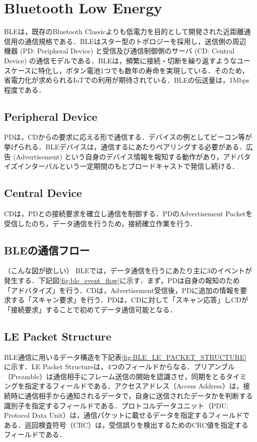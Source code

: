 \section{Bluetooth Low Energy}
BLEは，既存のBluetooth Classicよりも低電力を目的として開発された近距離通信用の通信規格である．BLEはスター型のトポロジーを採用し，送信側の周辺機器 (PD: Peripheral Device) と受信及び通信制御側のサーバ (CD: Central Device) の通信モデルである．BLEは，頻繁に接続・切断を繰り返すようなユースケースに特化し，ボタン電池1つでも数年の寿命を実現している．そのため，省電力化が求められるIoTでの利用が期待されている．BLEの伝送量は，1Mbps程度である．

\subsection{Peripheral Device}
PDは，CDからの要求に応える形で通信する．デバイスの例としてビーコン等が挙げられる．BLEデバイスは，通信するにあたりペアリングする必要がある．広告 (Advertisement) という自身のデバイス情報を報知する動作があり，アドバタイズインターバルという一定期間のもとブロードキャストで発信し続ける．

\subsection{Central Device}
CDは，PDとの接続要求を確立し通信を制御する．PDのAdvertisement Packetを受信したのち，データ通信を行うため，接続確立作業を行う．

\subsection{BLEの通信フロー}
（こんな図が欲しい）
BLEでは，データ通信を行うにあたり主に3のイベントが発生する．下記図\ref{fig:ble_event_flow}に示す．まず，PDは自身の報知のため「アドバタイズ」を行う．CDは，Advertisement受信後，PDに追加の情報を要求する「スキャン要求」を行う．PDは，CDに対して「スキャン応答」しCDが「接続要求」することで初めてデータ通信可能となる．

\subsection{LE Packet Structure}
BLE通信に用いるデータ構造を下記表\ref{fig:BLE_LE_PACKET_STRUCTURE}に示す．LE Packet Structureは，4つのフィールドからなる．プリアンブル（Preamble）は通信相手にフレーム送信の開始を認識させ，同期をとるタイミングを指定するフィールドである．アクセスアドレス（Access Address）は，接続時に通信相手から通知されるデータで，自身に送信されたデータかを判断する識別子を指定するフィールドである．プロトコルデータユニット（PDU: Protocol Data Unit）は，通信パケットに載せるデータを指定するフィールドである．巡回検査符号（CRC）は，受信誤りを検出するためのCRC値を指定するフィールドである．

